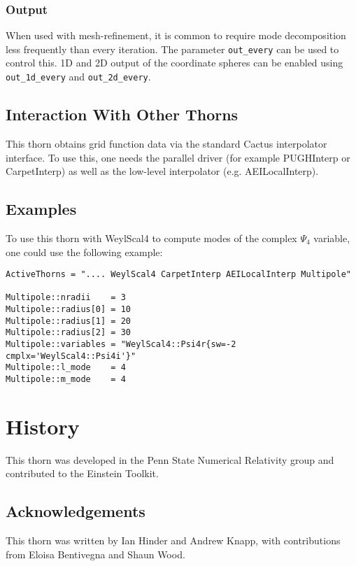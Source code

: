 \documentclass{article}
\begin{document}
\subsubsection{Output}
When used with mesh-refinement, it is common to require mode
decomposition less frequently than every iteration.  The parameter
\verb|out_every| can be used to control this.  1D and 2D output of the
coordinate spheres can be enabled using \verb|out_1d_every| and
\verb|out_2d_every|.

\subsection{Interaction With Other Thorns}

This thorn obtains grid function data via the standard Cactus
interpolator interface.  To use this, one needs the parallel driver
(for example PUGHInterp or CarpetInterp) as well as the low-level
interpolator (e.g. AEILocalInterp).

\subsection{Examples}

To use this thorn with WeylScal4 to compute modes of the complex
$\Psi_4$ variable, one could use the following example:

\begin{verbatim}
ActiveThorns = ".... WeylScal4 CarpetInterp AEILocalInterp Multipole"

Multipole::nradii    = 3
Multipole::radius[0] = 10
Multipole::radius[1] = 20
Multipole::radius[2] = 30
Multipole::variables = "WeylScal4::Psi4r{sw=-2 cmplx='WeylScal4::Psi4i'}"
Multipole::l_mode    = 4
Multipole::m_mode    = 4
\end{verbatim}

\section{History}

This thorn was developed in the Penn State Numerical Relativity group
and contributed to the Einstein Toolkit.

\subsection{Acknowledgements}

This thorn was written by Ian Hinder and Andrew Knapp, with
contributions from Eloisa Bentivegna and Shaun Wood.
\end{document}
